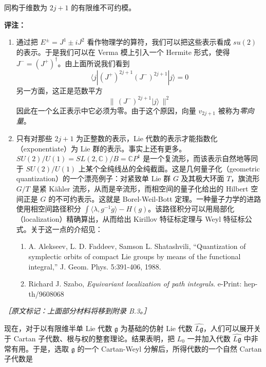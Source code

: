 同构于维数为 $2j+1$ 的有限维不可约模。

\textbf{评注：}

\begin{enumerate}
  \item 通过把 $E^\pm=J^1\pm iJ^2$ 看作物理学的算符，我们可以把这些表示看成 $su(2)$ 的表示。于是我们可以在 Verma 模上引入一个 Hermite 形式，使得 $J^-=(J^+)^\dagger$。由上面所说我们看到
  \begin{equation}
    \langle j|(J^+)^{2j+1}(J^-)^{2j+1}|j\rangle=0
    \tag{4.123}
    \label{eq:4.123}
  \end{equation}
  另一方面，这正是范数平方
  \begin{equation}
    \|\,(J^-)^{2j+1}|j\rangle\,\|^2
    \tag{4.124}
    \label{eq:4.124}
  \end{equation}
  因此在一个幺正表示中它必须为零。由于这个原因，向量 $v_{2j+1}$ 被称为\emph{零向量}。
  \item 只有对那些 $2j+1$ 为正整数的表示，Lie 代数的表示才能指数化（exponentiate）为 Lie 群的表示。事实上还有更多。$SU(2)/U(1)=SL(2,\mathbb{C})/B=\mathbb{C}P^1$ 是一个复流形，而该表示自然地等同于 $SU(2)/U(1)$ 上某个全纯线丛的全纯截面。这是几何量子化（geometric quantization）的一个漂亮例子：对紧致单 Lie 群 $G$ 及其极大环面 $T$，旗流形 $G/T$ 是紧 Kähler 流形，从而是辛流形，而相空间的量子化给出的 Hilbert 空间正是 $G$ 的不可约表示。这就是 Borel-Weil-Bott 定理。一种量子力学的进路使用相空间路径积分 $\int\langle\lambda,g^{-1}\dot g\rangle-H(g)$。该路径积分可以用局部化（localization）精确算出，从而给出 Kirillov 特征标定理与 Weyl 特征标公式。关于这一点的介绍见：
  \begin{enumerate}
    \item A. Alekseev, L. D. Faddeev, Samson L. Shatashvili, ``Quantization of symplectic orbits of compact Lie groups by means of the functional integral,'' J. Geom. Phys. 5:391-406, 1988.
    \item Richard J. Szabo, \emph{Equivariant localization of path integrals}. e-Print: hep-th/9608068
  \end{enumerate}
\end{enumerate}

{\small\itshape ［原文标记：上面部分材料将移到附录 B.3。］}

现在，对于以有限维半单 Lie 代数 $\mathfrak{g}$ 为基础的仿射 Lie 代数 $\widehat{L\mathfrak{g}}$，人们可以展开关于 Cartan 子代数、根与权的整套理论。结果表明，把 $L_0$ 一并加入代数 $\widehat{L\mathfrak{g}}$ 中非常有用。于是，选取 $\mathfrak{g}$ 的一个 Cartan-Weyl 分解后，所得代数的一个自然 Cartan 子代数是

